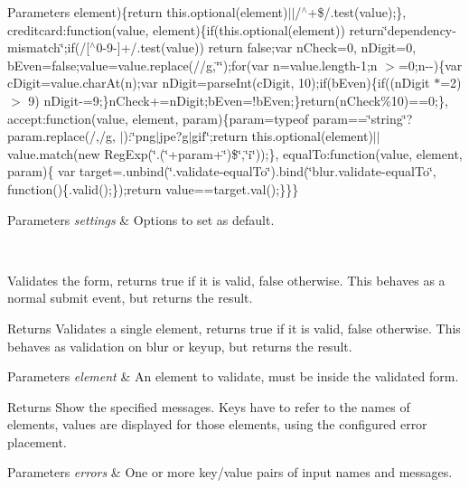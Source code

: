 \begin{DoxyParams}{Parameters}
element)\{return this.\+optional(element)$\vert$$\vert$/$^\wedge$+\$/.test(value);\}, creditcard\+:function(value, element)\{if(this.\+optional(element)) return\char`\"{}dependency-\/mismatch\char`\"{};if(/\mbox{[}$^\wedge$0-\/9-\/\mbox{]}+/.test(value)) return false;var n\+Check=0, n\+Digit=0, b\+Even=false;value=value.\+replace(//g,\char`\"{}\char`\"{});for(var n=value.\+length-\/1;n $>$=0;n-\/-\/)\{var c\+Digit=value.\+char\+At(n);var n\+Digit=parse\+Int(c\+Digit, 10);if(b\+Even)\{if((n\+Digit $\ast$=2) $>$ 9) n\+Digit-\/=9;\}n\+Check+=n\+Digit;b\+Even=!b\+Even;\}return(n\+Check\%10)==0;\}, accept\+:function(value, element, param)\{param=typeof param==\char`\"{}string\char`\"{}?param.\+replace(/,/g, \textquotesingle{}$\vert$\textquotesingle{})\+:\char`\"{}png$\vert$jpe?g$\vert$gif\char`\"{};return this.\+optional(element)$\vert$$\vert$value.match(new Reg\+Exp(\char`\"{}.(\char`\"{}+param+\char`\"{})\$\char`\"{},\char`\"{}i\char`\"{}));\}, equal\+To\+:function(value, element, param)\{ var target=.unbind(\char`\"{}.\+validate-\/equal\+To\char`\"{}).bind(\char`\"{}blur.\+validate-\/equal\+To\char`\"{}, function()\{.valid();\});return value==target.\+val();\}\}\} 
\begin{DoxyParams}{Parameters}
{\em settings} & Options to set as default. \\
\hline
\end{DoxyParams}
\\
\hline
\end{DoxyParams}
Validates the form, returns true if it is valid, false otherwise. This behaves as a normal submit event, but returns the result. 

\begin{DoxyReturn}{Returns}
Validates a single element, returns true if it is valid, false otherwise. This behaves as validation on blur or keyup, but returns the result. 
\end{DoxyReturn}

\begin{DoxyParams}{Parameters}
{\em element} & An element to validate, must be inside the validated form. \\
\hline
\end{DoxyParams}
\begin{DoxyReturn}{Returns}
Show the specified messages. Keys have to refer to the names of elements, values are displayed for those elements, using the configured error placement. 
\end{DoxyReturn}

\begin{DoxyParams}{Parameters}
{\em errors} & One or more key/value pairs of input names and messages. \\
\hline
\end{DoxyParams}


